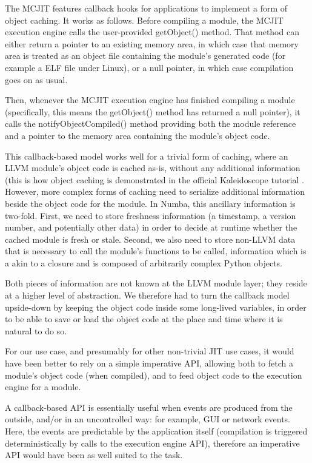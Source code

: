 \documentclass{acm_proc_article-sp}
\begin{document}
The MCJIT features callback hooks for
applications to implement a form of object caching.  It works as follows.
Before compiling a module, the MCJIT execution engine
calls the user-provided getObject() method.  That method can either
return a pointer to an existing memory area, in which case that
memory area is treated as an object file containing the module's
generated code (for example a ELF file under Linux), or a null pointer,
in which case compilation goes on as usual.

Then, whenever the MCJIT execution engine has finished compiling a
module (specifically, this means the getObject() method has returned
a null pointer), it calls the notifyObjectCompiled() method providing
both the module reference and a pointer to the memory area containing
the module's object code.

This callback-based model works well for a trivial form of caching,
where an LLVM module's object code is cached as-is, without any
additional information (this is how object caching is demonstrated in
the official Kaleidoscope tutorial \cite{llvmblog:kaleidoscope}.
However, more complex forms of
caching need to serialize additional information beside the object code
for the module.  In Numba, this ancillary information is two-fold.  First,
we need to store freshness information (a timestamp, a version number,
and potentially other data) in order to decide at runtime whether the
cached module is fresh or stale.  Second, we also need to store non-LLVM
data that is necessary to call the module's functions to be called,
information which is a akin to a closure and is composed of arbitrarily
complex Python objects.

Both pieces of information are not known at the LLVM module layer;
they reside at a higher level of abstraction.  We therefore had to
turn the callback model upside-down by keeping the object code inside
some long-lived variables, in order to be able to save or load
the object code at the place and time where it is natural to do so.

For our use case, and presumably for other non-trivial JIT use cases,
it would have been better to rely on a simple imperative API, allowing
both to fetch a module's object code (when compiled), and to feed object
code to the execution engine for a module.

A callback-based API is essentially useful when events are produced from
the outside, and/or in an uncontrolled way: for example, GUI or network
events.  Here, the events are predictable by the application
itself (compilation is triggered deterministically by calls to the
execution engine API), therefore an imperative API would have been as
well suited to the task.
\end{document}
